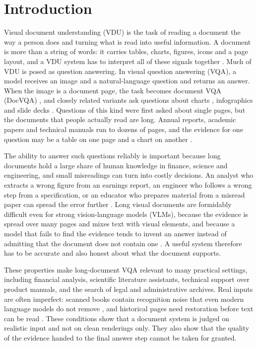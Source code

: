 
\section{Introduction}
\label{sec:intro}

Visual document understanding (VDU) is the task of reading a document the way a person does and turning what is read into useful information. A document is more than a string of words: it carries tables, charts, figures, icons and a page layout, and a VDU system has to interpret all of these signals together \cite{huang2022layoutlmv3,kim2022donut}. Much of VDU is posed as question answering. In visual question answering (VQA), a model receives an image and a natural-language question and returns an answer. When the image is a document page, the task becomes document VQA (DocVQA) \cite{mathew2021docvqa}, and closely related variants ask questions about charts \cite{masry2022chartqa}, infographics \cite{mathew2022infographicvqa} and slide decks \cite{tanaka2023slidevqa}. Questions of this kind were first asked about single pages, but the documents that people actually read are long. Annual reports, academic papers and technical manuals run to dozens of pages, and the evidence for one question may be a table on one page and a chart on another \cite{tito2023mpdocvqa,vanlandeghem2023dude}.

The ability to answer such questions reliably is important because long documents hold a large share of human knowledge in finance, science and engineering, and small misreadings can turn into costly decisions. An analyst who extracts a wrong figure from an earnings report, an engineer who follows a wrong step from a specification, or an educator who prepares material from a misread paper can spread the error further \cite{slideagent}. Long visual documents are formidably difficult even for strong vision-language models (VLMs), because the evidence is spread over many pages and mixes text with visual elements, and because a model that fails to find the evidence tends to invent an answer instead of admitting that the document does not contain one \cite{zhu2025doclens,ma2024mmlongbench}. A useful system therefore has to be accurate and also honest about what the document supports.

These properties make long-document VQA relevant to many practical settings, including financial analysis, scientific literature assistants, technical support over product manuals, and the search of legal and administrative archives. Real inputs are often imperfect: scanned books contain recognition noise that even modern language models do not remove \cite{nguyen2025gec}, and historical pages need restoration before text can be read \cite{guan2025preocr}. These conditions show that a document system is judged on realistic input and not on clean renderings only. They also show that the quality of the evidence handed to the final answer step cannot be taken for granted.


